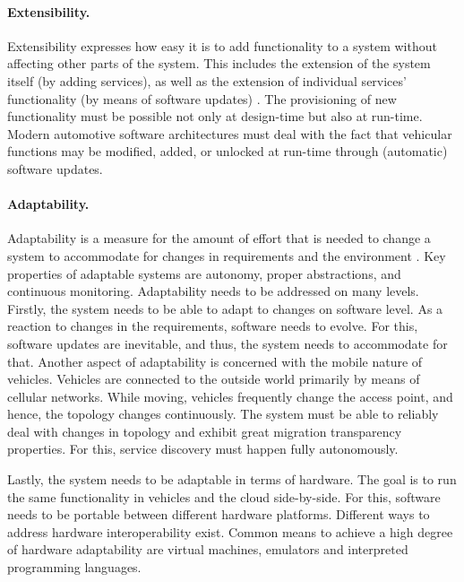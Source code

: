 \paragraph{Extensibility.}
Extensibility expresses how easy it is to add functionality to a system without affecting other parts of the system. This includes the extension of the system itself (by adding services), as well as the extension of individual services' functionality (by means of software updates) \cite{o2007quality}. The provisioning of new functionality must be possible not only at design-time but also at run-time. Modern automotive software architectures must deal with the fact that vehicular functions may be modified, added, or unlocked at run-time through (automatic) software updates.

\paragraph{Adaptability.}
Adaptability is a measure for the amount of effort that is needed to change a system to accommodate for changes in requirements and the environment \cite{o2007quality}. Key properties of adaptable systems are autonomy, proper abstractions, and continuous monitoring. Adaptability needs to be addressed on many levels. Firstly, the system needs to be able to adapt to changes on software level. As a reaction to changes in the requirements, software needs to evolve. For this, software updates are inevitable, and thus, the system needs to accommodate for that. Another aspect of adaptability is concerned with the mobile nature of vehicles. Vehicles are connected to the outside world primarily by means of cellular networks. While moving, vehicles frequently change the access point, and hence, the topology changes continuously. The system must be able to reliably deal with changes in topology and exhibit great migration transparency properties. For this, service discovery must happen fully autonomously.

Lastly, the system needs to be adaptable in terms of hardware. The goal is to run the same functionality in vehicles and the cloud side-by-side. For this, software needs to be portable between different hardware platforms. Different ways to address hardware interoperability exist. Common means to achieve a high degree of hardware adaptability are virtual machines, emulators and interpreted programming languages.



